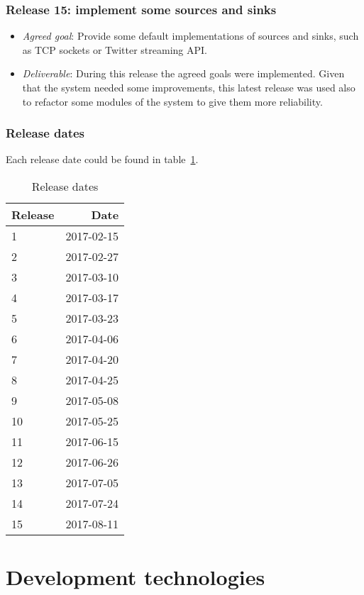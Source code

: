 \subsubsection{Release 15: implement some sources and sinks}
\begin{itemize}
\item \textit{Agreed goal}: Provide some default implementations of sources and
  sinks, such as TCP sockets or Twitter streaming \acs{API}.
\item \textit{Deliverable}: During this release the agreed goals were implemented. Given
  that the system needed some improvements, this latest release was used also to refactor
  some modules of the system to give them more reliability.
\end{itemize}

\subsubsection{Release dates}

Each release date could be found in table~\ref{tab:releasedates}.

\begin{table}[!h]
  \centering
\caption{Release dates}
\label{tab:releasedates}
\begin{tabular}{l|r}
\hline
Release & Date\\
\hline
1 & 2017-02-15\\
2 & 2017-02-27\\
3 & 2017-03-10\\
4 & 2017-03-17\\
5 & 2017-03-23\\
6 & 2017-04-06\\
7 & 2017-04-20\\
8 & 2017-04-25\\
9 & 2017-05-08\\
10 & 2017-05-25\\
11 & 2017-06-15\\
12 & 2017-06-26\\
13 & 2017-07-05\\
14 & 2017-07-24\\
15 & 2017-08-11\\
\hline
\end{tabular}
\end{table}

\section{Development technologies}

